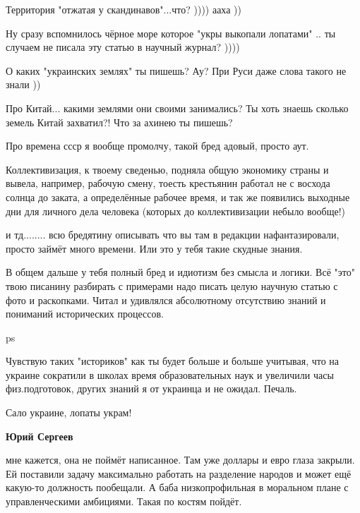 \begin{itemize}
Территория "отжатая у скандинавов"...что? )))) ааха ))

Ну сразу вспомнилось чёрное море которое "укры выкопали лопатами" .. ты случаем не писала эту статью в научный журнал? ))))

О каких "украинских землях" ты пишешь? Ау? При Руси даже слова такого не знали ))

Про Китай... какими землями они своими занимались? Ты хоть знаешь сколько земель Китай захватил?! Что за ахинею ты пишешь?

Про времена ссср я вообще промолчу, такой бред адовый, просто аут.

Коллективизация, к твоему сведенью, подняла общую экономику страны и вывела,
например, рабочую смену, тоесть крестьянин работал не с восхода солнца до
заката, а определённые рабочее время, и так же появились выходные дни для
личного дела человека (которых до коллективизации небыло вообще!)

и тд........ всю бредятину описывать что вы там в редакции нафантазировали,
просто займёт много времени. Или это у тебя такие скудные знания.

В общем дальше у тебя полный бред и идиотизм без смысла и логики. Всё "это"
твою писанину разбирать с примерами надо писать целую научную статью с фото и
раскопками. Читал и удивлялся абсолютному отсутствию знаний и пониманий
исторических процессов.

ps

Чувствую таких "историков" как ты будет больше и больше учитывая, что на
украине сократили в школах время образовательных наук и увеличили часы
физ.подготовок, других знаний я от украинца и не ожидал. Печаль.

Сало украине, лопаты украм!🤣

\begin{itemize}
 
\textbf{Юрий Сергеев} 

мне кажется, она не поймёт написанное. Там уже доллары и евро глаза закрыли. Ей
поставили задачу максимально работать на разделение народов и может ещё
какую-то должность пообещали. А баба низкопрофильная в моральном плане с
управленческими амбициями. Такая по костям пойдёт.


 


\end{itemize}
\end{itemize}
